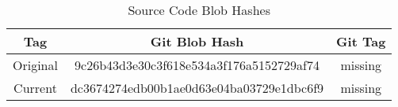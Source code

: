 \begin{longtable}{|c|c|c|}
    \caption{Source Code Blob Hashes}
    \label{tab:sourceCodeBlobHashes}

    \\ \hline

    \rowcolor{McMasterMediumGrey}
    \textbf{Tag} & \textbf{Git Blob Hash}                   & \textbf{Git Tag}
    \\ \hline

    Original     & 9c26b43d3e30c3f618e534a3f176a5152729af74 & missing
    \\ \hline

    Current      & dc3674274edb00b1ae0d63e04ba03729e1dbc6f9 & missing
    \\ \hline
\end{longtable}

